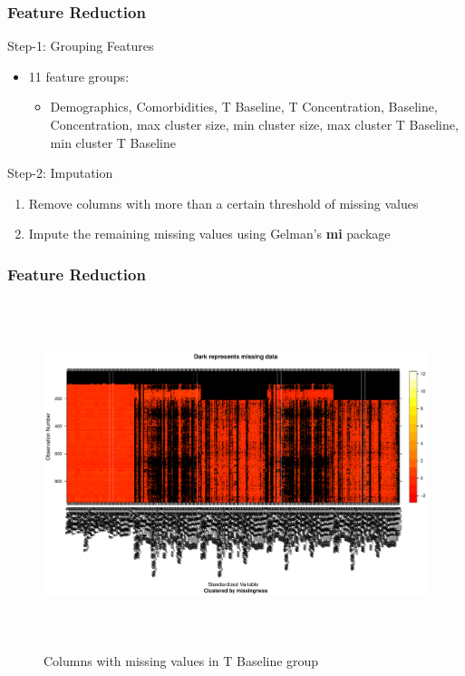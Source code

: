 \documentclass{beamer}
\begin{document}
\begin{frame}\frametitle{Feature Reduction}

	\begin{block}{Step-1: Grouping Features}
		\begin{itemize}
			\item 11 feature groups:
			\begin{itemize}
				\item Demographics, Comorbidities, T Baseline, T Concentration, Baseline, Concentration, max cluster size, min cluster size, max cluster T Baseline, min cluster T Baseline
				
			\end{itemize}
	\end{itemize}\end{block}	\begin{block}{Step-2: Imputation}
\begin{enumerate}
\item Remove columns with more than a certain threshold of missing values
\item Impute the remaining missing values using Gelman's \textbf{mi} package
\end{enumerate}\end{block}	
\end{frame}


\begin{frame}\frametitle{Feature Reduction}

\begin{figure}[ht]
\includegraphics[width=4.8in,height=4in]{missing.pdf}
\caption{\footnotesize Columns with missing values in T Baseline group}
	\end{figure}	\end{frame}
		
\end{document}
